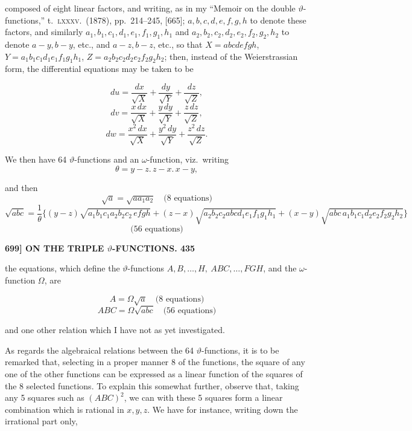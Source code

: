 \documentclass[11pt]{article}
\begin{document}
composed of eight linear factors, and writing, as in my ``Memoir on the double $\vartheta$-functions,'' t.~\textsc{lxxxv}.~(1878), pp.~214--245, [665]; $a, b, c, d, e, f, g, h$ to denote these factors, and similarly $a_1, b_1, c_1, d_1, e_1, f_1, g_1, h_1$ and $a_2, b_2, c_2, d_2, e_2, f_2, g_2, h_2$ to denote $a-y, b-y$, etc., and $a-z, b-z$, etc., so that $X = abcdefgh$, $Y = a_1 b_1 c_1 d_1 e_1 f_1 g_1 h_1$, $Z = a_2 b_2 c_2 d_2 e_2 f_2 g_2 h_2$; then, instead of the Weierstrassian form, the differential equations may be taken to be

\[
du = \frac{dx}{\sqrt{X}} + \frac{dy}{\sqrt{Y}} + \frac{dz}{\sqrt{Z}},
\]
\[
dv = \frac{x\,dx}{\sqrt{X}} + \frac{y\,dy}{\sqrt{Y}} + \frac{z\,dz}{\sqrt{Z}},
\]
\[
dw = \frac{x^2\,dx}{\sqrt{X}} + \frac{y^2\,dy}{\sqrt{Y}} + \frac{z^2\,dz}{\sqrt{Z}}.
\]

We then have 64 $\vartheta$-functions and an $\omega$-function, viz.\ writing
\[
\theta = y-z.\,z-x.\,x-y,
\]

and then
\[
\sqrt{a} = \sqrt{a a_1 a_2} \quad \text{(8 equations)}
\]
\[
\sqrt{abc} = \frac{1}{\theta}\bigl\{(y-z)\sqrt{a_1 b_1 c_1 a_2 b_2 c_2\, efgh} + (z-x)\sqrt{a_2 b_2 c_2 abcd_1 e_1 f_1 g_1 h_1} + (x-y)\sqrt{abc\, a_1 b_1 c_1 d_2 e_2 f_2 g_2 h_2}\bigr\}
\]
\[
\text{(56 equations)}
\]

\bigskip
\noindent\textbf{699] \quad ON THE TRIPLE $\vartheta$-FUNCTIONS. \hfill 435}

\medskip

the equations, which define the $\vartheta$-functions $A, B, \ldots, H,\ ABC, \ldots, FGH$, and the $\omega$-function $\Omega$, are

\[
A = \Omega\sqrt{a} \quad \text{(8 equations)}
\]
\[
ABC = \Omega\sqrt{abc} \quad \text{(56 equations)}
\]

and one other relation which I have not as yet investigated.

\medskip

As regards the algebraical relations between the 64 $\vartheta$-functions, it is to be remarked that, selecting in a proper manner 8 of the functions, the square of any one of the other functions can be expressed as a linear function of the squares of the 8 selected functions. To explain this somewhat further, observe that, taking any 5 squares such as $(ABC)^2$, we can with these 5 squares form a linear combination which is rational in $x, y, z$. We have for instance, writing down the irrational part only,
\end{document}
